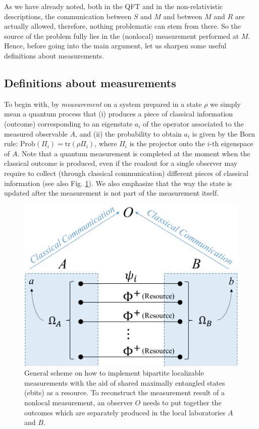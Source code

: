 \documentclass[12pt]{article}
\begin{document}
 
As we have already noted, both in the QFT and in the non-relativistic descriptions, the communication between $S$ and $M$ and between $M$ and $R$ are actually allowed, therefore, nothing problematic can stem from there. So the source of the problem fully lies in the (nonlocal) measurement performed at $M$.
Hence, before going into the main argument, let us  sharpen some useful definitions about measurements. 

\subsection{Definitions about measurements}
\label{defmeas}
To begin with, by \textit{measurement} on a system prepared in a state $\rho$ we simply mean a quantum process that (i) produces a piece of classical information (outcome)  corresponding to an eigenstate $a_i$ of the operator associated to the measured observable $A$, and (ii) the probability to obtain $a_i$ is given by the Born rule: $ {\text{Prob}}(\Pi_i)= \text{tr} (\rho \Pi_i)$, where $\Pi_i$ is the projector onto the $i$-th eigenspace of $A$.  Note that a quantum measurement is completed at the moment when the classical outcome is produced, even if the readout for a single observer may require to collect (through classical communication) different pieces of classical information (see also Fig. \ref{figloca}). We also emphasize that the way the state is updated after the measurement is not part of the measurement itself.  
 \begin{figure}[ht]
    \centering
    \includegraphics[width=.44\textwidth]{localiza.png}
    \caption{General scheme on how to implement bipartite localizable measurements with the aid of shared maximally entangled states (ebits) as a resource. To reconstruct the measurement result of a nonlocal measurement, an observer $O$ needs to put together the outcomes which are separately produced in the local laboratories $A$ and $B$.}
    \label{figloca}
\end{figure}
\end{document}
